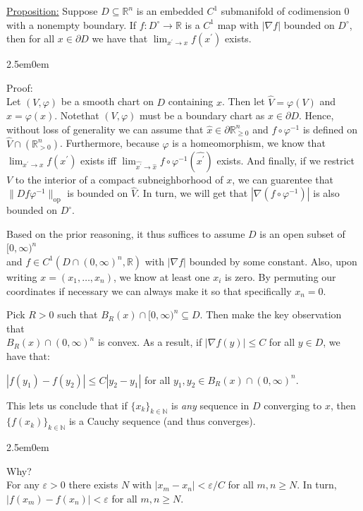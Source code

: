 \documentclass{book}
\newcommand{\pracTwo}{
   \color{Orange}%
   \fontsize{12}{14}\selectfont%
}
\newcommand{\exPPP}{%
   \color{VioletRed}%
   \fontsize{12}{14}\selectfont%
}
\newenvironment{myIndent}{%
   \begin{adjustwidth}{2.5em}{0em}%
}{%
   \end{adjustwidth}%
}
\newcommand{\opnorm}{\mathrm{op}}
\newcommand{\retTwo}{\hfill\bigbreak}
\begin{document}
\ul{Proposition:} Suppose $D \subseteq \mathbb{R}^n$ is an embedded $C^1$ submanifold of codimension $0$ with a nonempty boundary. If $f: D^\circ \to \mathbb{R}$ is a $C^1$ map with  $|\nabla f|$ bounded on $D^\circ$, then for all $x \in \partial D$ we have that $\lim_{x^\prime \to x} f(x^\prime)$ exists.
\begin{myIndent}\pracTwo 
	Proof:\\
	Let $(V, \varphi)$ be a smooth chart on $D$ containing $x$. Then let $\widehat{V} = \varphi(V)$ and $\widehat{x} = \varphi(x)$. Note\newpage that $(V, \varphi)$ must be a boundary chart as $x \in \partial D$. Hence, without loss of generality we can assume that $\widehat{x} \in \partial \mathbb{R}_{\geq 0}^n$ and $f \circ \varphi^{-1}$ is defined on $\widehat{V} \cap (\mathbb{R}_{>0}^n)$. Furthermore, because $\varphi$ is a homeomorphism, we know that $\lim_{x^\prime \to x} f(x^\prime)$ exists iff $\lim_{\widehat{x^\prime} \to \widehat{x}} f \circ \varphi^{-1}(\widehat{x^\prime})$ exists. And finally, if we restrict $V$ to the interior of a compact subneighborhood of $x$, we can guarentee that $\|Df \varphi^{-1}\|_{\opnorm}$ is bounded on $\widehat{V}$. In turn, we will get that $|\nabla (f \circ \varphi^{-1})|$ is also bounded on $D^\circ$.\retTwo

	Based on the prior reasoning, it thus suffices to assume $D$ is an open subset of $[0, \infty)^n$\\ and $f \in C^1(D \cap (0, \infty)^n, \mathbb{R})$ with $|\nabla f|$ bounded by some constant. Also, upon\\ writing $x = (x_1, \ldots, x_n)$, we know at least one $x_i$ is zero. By permuting our\\ coordinates if necessary we can always make it so that specifically $x_n = 0$.\retTwo

	Pick $R > 0$ such that $B_R(x) \cap [0, \infty)^n \subseteq D$. Then make the key observation that\\ $B_R(x) \cap (0, \infty)^n$ is convex. As a result, if $|\nabla f(y)| \leq C$ for all $y \in D$, we have that:

	{\centering $|f(y_1) - f(y_2)| \leq C|y_2 - y_1|$ for all $y_1, y_2 \in B_R(x) \cap (0, \infty)^n$. \retTwo\par}

	This lets us conclude that if $\{x_k\}_{k \in \mathbb{N}}$ is \textit{any} sequence in $D$ converging to $x$, then\\ $\{f(x_k)\}_{k \in \mathbb{N}}$ is a Cauchy sequence (and thus converges).
	\begin{myIndent}\exPPP
		Why?\\
		For any $\varepsilon > 0$ there exists $N$ with $|x_m - x_n| < \varepsilon / C$ for all $m, n \geq N$. In turn, $|f(x_m) - f(x_n)| < \varepsilon$ for all $m, n \geq N$.\retTwo
	\end{myIndent}


\end{myIndent}
\end{document}
